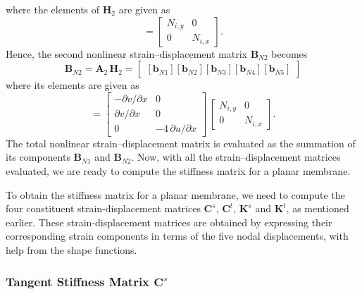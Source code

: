 \normalsize
where the elements of $\mathbf{H}_2$ are given as
\begin{equation}
[\mathbf{h}_i] = \begin{bmatrix}
N_{i,y} &  0  \\
0 & N_{i,x}  \end{bmatrix}. 
\end{equation}
Hence, the second nonlinear strain--displacement matrix $\mathbf{B}_{N2}$ becomes
\begin{equation}
\mathbf{B}_{N2} = \mathbf{A}_2 \, \mathbf{H}_2 = \begin{bmatrix}
[\mathbf{b}_{N1}] [\mathbf{b}_{N2}] [\mathbf{b}_{N3}] [\mathbf{b}_{N4}] [\mathbf{b}_{N5}] 
\end{bmatrix} 
\end{equation}
where its elements are given as
\begin{equation}
[\mathbf{b}_{Ni}] = \begin{bmatrix}
- \partial v / \partial x &  0 \\
\partial v / \partial x &  0 \\
0 & -4 \, \partial u / \partial x  \end{bmatrix} \, \begin{bmatrix}
N_{i,y} &  0  \\
0 & N_{i,x}  \end{bmatrix}. 
\end{equation}
The total nonlinear strain--displacement matrix is evaluated as the summation of its components $ \mathbf{B}_{N1}$ and $\mathbf{B}_{N2}$. Now, with all the strain--displacement matrices evaluated, we are ready to compute the stiffness matrix for a planar membrane.

To obtain the stiffness matrix for a planar membrane, we need to compute the four constituent strain-displacement matrices $\mathbf{C}^s$, $\mathbf{C}^t$, $\mathbf{K}^s$ and $\mathbf{K}^t$, as mentioned earlier. These strain-displacement matrices are obtained by expressing their corresponding strain components in terms of the five nodal displacements, with help from the shape functions.


\subsubsection{Tangent Stiffness Matrix $\mathbf{C}^s$}

